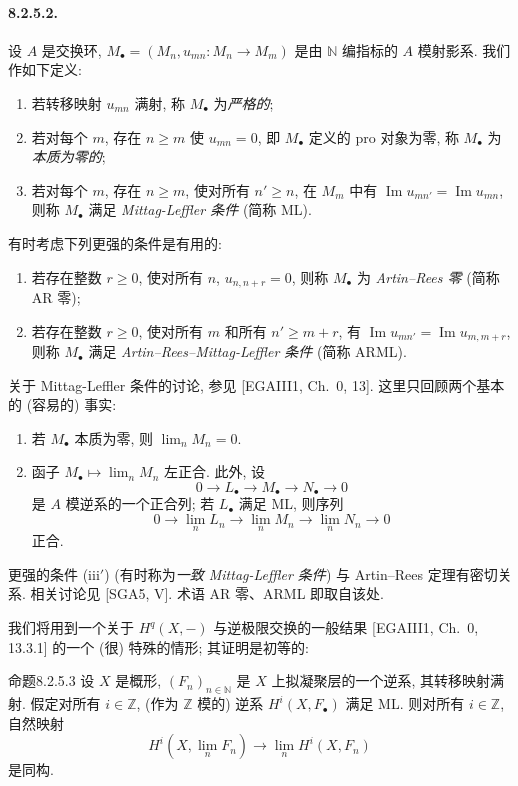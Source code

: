 \paragraph{8.2.5.2.}
设 $A$ 是交换环, $M_\bullet=(M_n,u_{mn}:M_n\to M_m)$ 是由 $\mathbb N$ 编指标的 $A$ 模射影系. 我们作如下定义:
\begin{enumerate}
\item[(i)] 若转移映射 $u_{mn}$ 满射, 称 $M_\bullet$ 为\emph{严格的};
\item[(ii)] 若对每个 $m$, 存在 $n\geq m$ 使 $u_{mn}=0$, 即 $M_\bullet$ 定义的 pro 对象为零, 称 $M_\bullet$ 为\emph{本质为零的};
\item[(iii)] 若对每个 $m$, 存在 $n\geq m$, 使对所有 $n'\geq n$, 在 $M_m$ 中有 $\operatorname{Im}u_{mn'}=\operatorname{Im}u_{mn}$, 则称 $M_\bullet$ 满足 \emph{Mittag-Leffler 条件} (简称 ML).
\end{enumerate}
有时考虑下列更强的条件是有用的:
\begin{enumerate}
\item[(ii$'$)] 若存在整数 $r\geq0$, 使对所有 $n$, $u_{n,n+r}=0$, 则称 $M_\bullet$ 为 \emph{Artin--Rees 零} (简称 AR 零);
\item[(iii$'$)] 若存在整数 $r\geq0$, 使对所有 $m$ 和所有 $n'\geq m+r$, 有 $\operatorname{Im}u_{mn'}=\operatorname{Im}u_{m,m+r}$, 则称 $M_\bullet$ 满足 \emph{Artin--Rees--Mittag-Leffler 条件} (简称 ARML).
\end{enumerate}
关于 Mittag-Leffler 条件的讨论, 参见 [EGAIII1, Ch.~0, 13]. 这里只回顾两个基本的 (容易的) 事实:
\begin{enumerate}
\item[(a)] 若 $M_\bullet$ 本质为零, 则 $\lim_nM_n=0$.
\item[(b)] 函子 $M_\bullet\mapsto\lim_nM_n$ 左正合. 此外, 设
\[0\longrightarrow L_\bullet\longrightarrow M_\bullet\longrightarrow N_\bullet\longrightarrow0\]
是 $A$ 模逆系的一个正合列; 若 $L_\bullet$ 满足 ML, 则序列
\[0\longrightarrow\lim_nL_n\longrightarrow\lim_nM_n\longrightarrow\lim_nN_n\longrightarrow0\]
正合.
\end{enumerate}
更强的条件 (iii$'$) (有时称为\emph{一致 Mittag-Leffler 条件}) 与 Artin--Rees 定理有密切关系. 相关讨论见 [SGA5, V]. 术语 AR 零、ARML 即取自该处.

我们将用到一个关于 $H^q(X,-)$ 与逆极限交换的一般结果 [EGAIII1, Ch.~0, 13.3.1] 的一个 (很) 特殊的情形; 其证明是初等的:
\begin{origstatement}{命题}{8.2.5.3}\label{ch08:prop8253}
设 $X$ 是概形, $(F_n)_{n\in\mathbb N}$ 是 $X$ 上拟凝聚层的一个逆系, 其转移映射满射. 假定对所有 $i\in\mathbb Z$, (作为 $\mathbb Z$ 模的) 逆系 $H^i(X,F_\bullet)$ 满足 ML. 则对所有 $i\in\mathbb Z$, 自然映射
\[H^i(X,\lim_nF_n)\longrightarrow\lim_nH^i(X,F_n)\]
是同构.
\end{origstatement}

